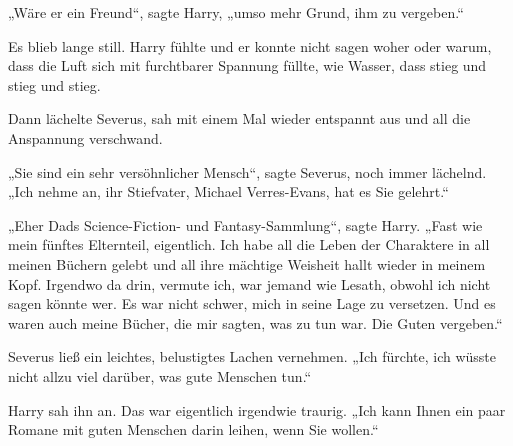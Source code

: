„Wäre er ein Freund“, sagte Harry, „umso mehr Grund, ihm zu vergeben.“

Es blieb lange still. Harry fühlte und er konnte nicht sagen woher oder warum, dass die Luft sich mit furchtbarer Spannung füllte, wie Wasser, dass stieg und stieg und stieg.

Dann lächelte Severus, sah mit einem Mal wieder entspannt aus und all die Anspannung verschwand.

„Sie sind ein sehr versöhnlicher Mensch“, sagte Severus, noch immer lächelnd. „Ich nehme an, ihr Stiefvater, Michael Verres-Evans, hat es Sie gelehrt.“

„Eher Dads Science-Fiction- und Fantasy-Sammlung“, sagte Harry. „Fast wie mein fünftes Elternteil, eigentlich. Ich habe all die Leben der Charaktere in all meinen Büchern gelebt und all ihre mächtige Weisheit hallt wieder in meinem Kopf. Irgendwo da drin, vermute ich, war jemand wie Lesath, obwohl ich nicht sagen könnte wer. Es war nicht schwer, mich in seine Lage zu versetzen. Und es waren auch meine Bücher, die mir sagten, was zu tun war. Die Guten vergeben.“

Severus ließ ein leichtes, belustigtes Lachen vernehmen. „Ich fürchte, ich wüsste nicht allzu viel darüber, was gute Menschen tun.“

Harry sah ihn an. Das war eigentlich irgendwie traurig. „Ich kann Ihnen ein paar Romane mit guten Menschen darin leihen, wenn Sie wollen.“

